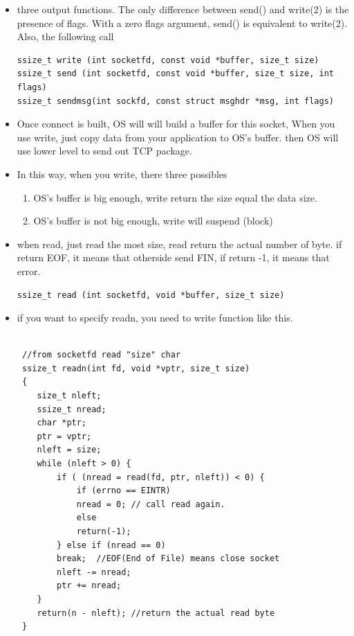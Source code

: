 \documentclass[a4paper,11pt,twoside]{book}
\begin{document}
\begin{itemize}
\begin{lstlisting}
//check current UDP_SOCKET receiving buffer
int curRcvBufSize = -1;
optlen = sizeof(curRcvBufSize);
if (getsockopt(sockfd, SOL_SOCKET, SO_RCVBUF, &curRcvBufSize, &optlen) < 0)
{
	printf("getsockopt error=%d(%s)!!!\n", errno, strerror(errno));
	goto error;
}
printf("OS current udp socket(%d) recv buff size is: %d\n", curRcvBufSize);
\end{lstlisting}
	
	\item three output functions. The  only difference between send() and write(2) is the
	presence of flags.  With a zero flags argument, send() is equivalent to  write(2).   Also,
	the following call
	
\begin{lstlisting}
ssize_t write (int socketfd, const void *buffer, size_t size)
ssize_t send (int socketfd, const void *buffer, size_t size, int flags)
ssize_t sendmsg(int sockfd, const struct msghdr *msg, int flags)	
\end{lstlisting}
	\item Once connect is built, OS will will build a buffer for this socket, When you use write, just copy data from your application to OS's buffer. then OS will use lower level to send out TCP package.
	
	\item In this way, when you write, there three possibles
	\begin{enumerate}
		\item OS's buffer is big enough, write return the size equal the data size.
		\item OS's buffer is not big enough, write will suspend (block)
	\end{enumerate}

	\item when read, just read the most size, read return the actual number of byte.  if return EOF, it means that otherside send FIN,  if return -1, it means that error.
\begin{lstlisting}
ssize_t read (int socketfd, void *buffer, size_t size)	
\end{lstlisting}	

 \item if you want to specify readn, you need to write function like this.
 
 \begin{lstlisting}

 //from socketfd read "size" char
 ssize_t readn(int fd, void *vptr, size_t size)
 {
 	size_t nleft;
 	ssize_t nread;
 	char *ptr;
 	ptr = vptr;
 	nleft = size;
 	while (nleft > 0) {
 		if ( (nread = read(fd, ptr, nleft)) < 0) {
 			if (errno == EINTR)
 			nread = 0; // call read again.
 			else
 			return(-1);
 		} else if (nread == 0)
 		break;  //EOF(End of File) means close socket
 		nleft -= nread;
 		ptr += nread;
 	}
 	return(n - nleft); //return the actual read byte 
 }
 \end{lstlisting}


\end{itemize}
\end{document}
